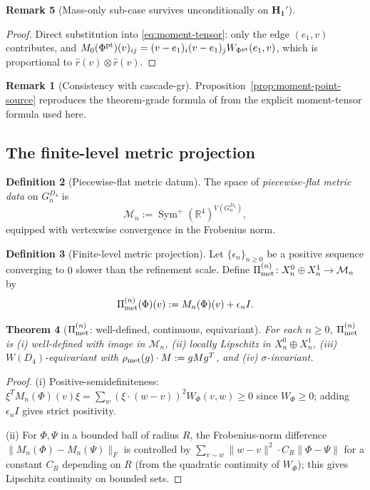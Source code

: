 \documentclass[11pt, a4paper]{amsart}
\newtheorem{theorem}{Theorem}[section]
\theoremstyle{definition}
\newtheorem{definition}[theorem]{Definition}
\newtheorem{remark}[theorem]{Remark}
\newcommand{\R}{\mathbb{R}}
\newcommand{\met}{{\rm met}}
\newcommand{\Sym}{\operatorname{Sym}}
\begin{document}
\begin{remark}[Mass-only sub-case survives unconditionally on $\mathbf{H_1'}$]
\begin{proof}
Direct substitution into \eqref{eq:moment-tensor}: only the edge
$(e_1, v)$ contributes, and
$M_0(\Phi^{\rm pt})(v)_{ij} = (v - e_1)_i (v - e_1)_j W_{\Phi^{\rm pt}}
(e_1, v)$, which is proportional to $\hat r(v) \otimes \hat r(v)$.
\end{proof}

\begin{remark}[Consistency with cascade-gr]
Proposition~\ref{prop:moment-point-source} reproduces the
theorem-grade formula of \cite[\S C4.1]{CascadeGR} from the explicit
moment-tensor formula used here.
\end{remark}

\subsection{The finite-level metric projection}
\label{subsec:pimet-n}

\begin{definition}[Piecewise-flat metric datum]
\label{def:pf-metric}
The space of \emph{piecewise-flat metric data} on $G_n^{D_4}$ is
\[
  \mathcal{M}_n := \Sym^+(\R^4)^{V(G_n^{D_4})},
\]
equipped with vertexwise convergence in the Frobenius norm.
\end{definition}

\begin{definition}[Finite-level metric projection]
\label{def:pimet-n}
Let $\{\epsilon_n\}_{n \geq 0}$ be a positive sequence converging
to $0$ slower than the refinement scale. Define
$\Pi_{\met}^{(n)} \colon X_n^0 \oplus X_n^1 \to \mathcal{M}_n$ by
\[
  \Pi_{\met}^{(n)}(\Phi)(v) := M_n(\Phi)(v) + \epsilon_n I.
\]
\end{definition}

\begin{theorem}[$\Pi_{\met}^{(n)}$: well-defined, continuous, equivariant]
\label{thm:pimet-n}
For each $n \geq 0$, $\Pi_{\met}^{(n)}$ is (i) well-defined with
image in $\mathcal{M}_n$, (ii) locally Lipschitz in
$X_n^0 \oplus X_n^1$, (iii) $W(D_4)$-equivariant with $\rho_{\met}(g)
\cdot M := g M g^T$, and (iv) $\sigma$-invariant.
\end{theorem}

\begin{proof}
(i) Positive-semidefiniteness:
$\xi^T M_n(\Phi)(v) \xi = \sum_w (\xi \cdot (w - v))^2 W_\Phi(v, w)
\geq 0$ since $W_\Phi \geq 0$; adding $\epsilon_n I$ gives strict
positivity.

(ii) For $\Phi, \Psi$ in a bounded ball of radius $R$, the
Frobenius-norm difference
$\|M_n(\Phi) - M_n(\Psi)\|_F$ is controlled by
$\sum_{v \sim w} \|w - v\|^2 \cdot C_R \|\Phi - \Psi\|$ for a
constant $C_R$ depending on $R$ (from the quadratic continuity of
$W_\Phi$); this gives Lipschitz continuity on bounded sets.


\end{proof}
\end{remark}
\end{document}
